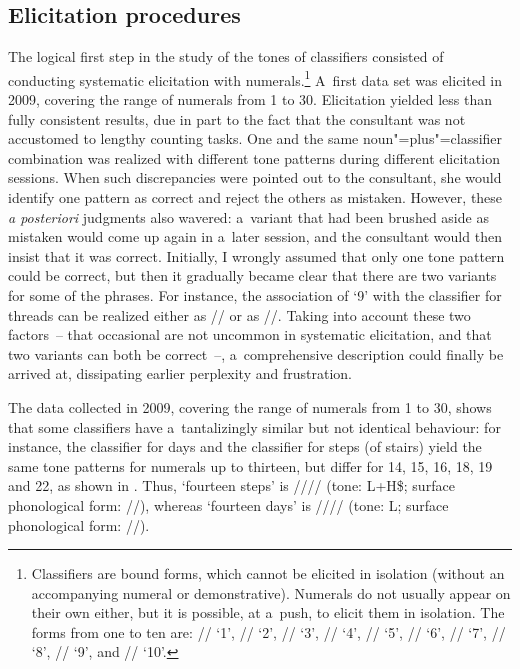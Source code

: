 \subsection{Elicitation procedures}
\label{sec:elicitationprocedures}
\label{sec:recordings}

The logical first step in the study of the tones of classifiers consisted of conducting systematic elicitation with numerals.\footnote{Classifiers are bound forms, which cannot be elicited in isolation (without an accompanying numeral or demonstrative). Numerals do not usually appear on their own either, but it is possible, at a~push, to elicit them in isolation. The forms from one to ten are: // ‘1’, // ‘2’, // ‘3’, // ‘4’, // ‘5’, // ‘6’, // ‘7’, // ‘8’, // ‘9’, and // ‘10’.} A~first data set was elicited in 2009, covering the range of numerals from 1 to 30. Elicitation yielded less than fully consistent results, due in part to the fact that the consultant was not accustomed to lengthy
counting tasks. One and the same noun"=plus"=classifier combination was realized with different tone patterns during different elicitation sessions. When such discrepancies were
pointed out to the consultant, she would identify one pattern as correct and reject the others as
mistaken. However, these \textit{a posteriori} judgments also wavered: a~variant that had been
brushed aside as mistaken would come up again in a~later session, and the consultant would then
insist that it was correct. Initially, I wrongly assumed that only one tone pattern could be
correct, but then it gradually became clear that there are two variants for some of the phrases. For
instance, the association of ‘9’ with the classifier for threads can be realized either as
// or as //.
Taking into
account these two factors~-- that occasional  are not uncommon in systematic elicitation,
and that two variants can both be correct~--, a~comprehensive description could finally be arrived
at, dissipating earlier perplexity and frustration.

The data collected in 2009, covering the range of numerals from 1 to 30, shows that some classifiers have a~tantalizingly similar but not identical behaviour: for instance, the classifier for days and the classifier for steps (of stairs) yield the same tone patterns for numerals up to thirteen, but differ for 14, 15, 16, 18, 19 and 22, as shown in . Thus, ‘fourteen steps' is //// (tone: L+H\$; surface phonological form: //), whereas ‘fourteen days' is //// (tone: L; surface phonological form: //).


